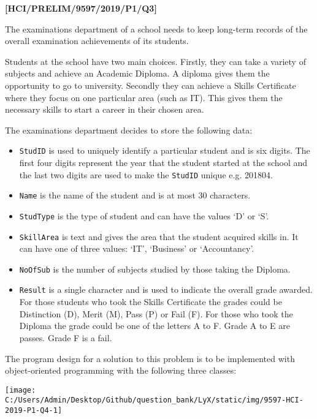 \item \textbf{{[}HCI/PRELIM/9597/2019/P1/Q3{]} }

The examinations department of a school needs to keep long-term records
of the overall examination achievements of its students.

Students at the school have two main choices. Firstly, they can take
a variety of subjects and achieve an Academic Diploma. A diploma gives
them the opportunity to go to university. Secondly they can achieve
a Skills Certificate where they focus on one particular area (such
as IT). This gives them the necessary skills to start a career in
their chosen area.

The examinations department decides to store the following data:
\begin{itemize}
\item \texttt{StudID} is used to uniquely identify a particular student
and is six digits. The first four digits represent the year that the
student started at the school and the last two digits are used to
make the \texttt{StudID} unique e.g. 201804.
\item \texttt{Name} is the name of the student and is at most 30 characters.
\item \texttt{StudType} is the type of student and can have the values \textquoteleft D\textquoteright{}
or \textquoteleft S\textquoteright .
\item \texttt{SkillArea} is text and gives the area that the student acquired
skills in. It can have one of three values: \textquoteleft IT\textquoteright ,
\textquoteleft Business\textquoteright{} or \textquoteleft Accountancy\textquoteright .
\item \texttt{NoOfSub} is the number of subjects studied by those taking
the Diploma. 
\item \texttt{Result} is a single character and is used to indicate the
overall grade awarded. For those students who took the Skills Certificate
the grades could be Distinction (D), Merit (M), Pass (P) or Fail (F).
For those who took the Diploma the grade could be one of the letters
A to F. Grade A to E are passes. Grade F is a fail.
\end{itemize}
The program design for a solution to this problem is to be implemented
with object-oriented programming with the following three classes:
\begin{center}
\texttt{[image: C:/Users/Admin/Desktop/Github/question\_bank/LyX/static/img/9597-HCI-2019-P1-Q4-1]}
\par\end{center}

